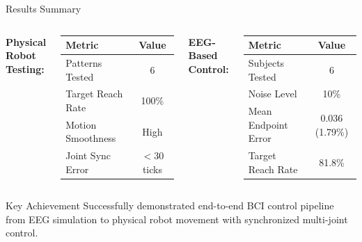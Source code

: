 \documentclass[aspectratio=169, 11pt]{beamer}
\begin{document}
\begin{frame}{Results Summary}
    \begin{columns}[T]
        \textbf{Physical Robot Testing:}
        \begin{table}
            \centering
            \small
            \begin{tabular}{lc}
                \toprule
                Metric & Value \\
                \midrule
                Patterns Tested & 6 \\
                Target Reach Rate & 100\% \\
                Motion Smoothness & High \\
                Joint Sync Error & $<$30 ticks \\
                \bottomrule
            \end{tabular}
        \end{table}
        
        \textbf{EEG-Based Control:}
        \begin{table}
            \centering
            \small
            \begin{tabular}{lc}
                \toprule
                Metric & Value \\
                \midrule
                Subjects Tested & 6 \\
                Noise Level & 10\% \\
                Mean Endpoint Error & 0.036 (1.79\%) \\
                Target Reach Rate & 81.8\% \\
                \bottomrule
            \end{tabular}
        \end{table}
    \end{columns}
    
    \vspace{5mm}
    \begin{block}{Key Achievement}
        Successfully demonstrated end-to-end BCI control pipeline from EEG simulation to physical robot movement with synchronized multi-joint control.
    \end{block}
\end{frame}
\end{document}

